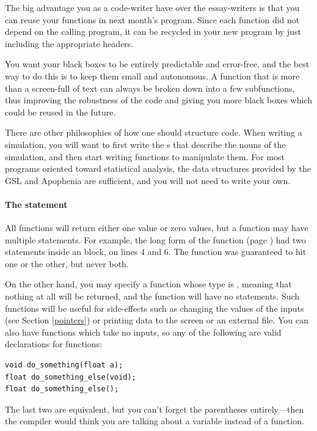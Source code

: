 The big advantage you as a code-writer have over the essay-writers is
that you can reuse your functions in next month's program.  Since each
function did not depend on the calling program, it can be recycled in
your new program by just including the appropriate headers.

You want your black boxes to be entirely predictable and error-free,
and the best way to do this is to keep them small and autonomous. A
function that is more than a screen-full of text can always be broken
down into a few subfunctions, thus improving the robustness of the code
and giving you more black boxes which could be reused in the future.

There are other philosophies of how one should structure code.  When
writing a simulation, you will want to first write the s that
describe the nouns of the simulation, and then start writing functions
to manipulate them.  For most programs oriented toward statistical
analysis, the data structures provided by the GSL and Apophenia are
sufficient, and you will not need to write your own.

\paragraph{\treesymbol{} The  statement} 
All functions will return
either one value or zero values, but a function may have
multiple  statements. For example, the long form of the
 function (page \pageref{isevenfn}) had two  statements inside
an  block, on lines 4 and 6. The function was guaranteed
to hit one or the other, but never both.

On the other hand,  you may specify a function whose type is ,
meaning that nothing at all will be returned, and the function will
have no  statements. Such functions will be useful for
side-effects such as changing the values of the inputs (see Section
\ref{pointers}) or printing data to the screen or an external file. You
can also have functions which take no inputs, so any of the following
are valid declarations for functions:

\begin{lstlisting}
void do_something(float a);
float do_something_else(void);
float do_something_else();
\end{lstlisting}

The last two are equivalent, but you can't forget the parentheses
entirely---then the compiler would think you are talking about a variable
instead of a function.

